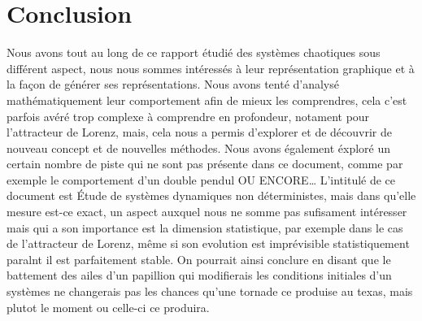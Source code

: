 \chapter{Conclusion}

Nous avons tout au long de ce rapport étudié des systèmes chaotiques
sous différent aspect, nous nous sommes intéressés à leur représentation
graphique et à la façon de générer ses représentations. Nous avons tenté d'analysé mathématiquement leur comportement
afin de mieux les comprendres, cela c'est parfois avéré trop complexe 
à comprendre en profondeur, notament pour l'attracteur de Lorenz, mais,
cela nous a permis d'explorer et de découvrir de nouveau concept et de 
nouvelles méthodes. Nous avons également éxploré un certain nombre de piste qui ne sont
pas présente dans ce document, comme par exemple le comportement d'un double pendul OU ENCORE\dots
L'intitulé de ce document est Étude de systèmes dynamiques non déterministes, mais dans qu'elle mesure est-ce
exact, un aspect auxquel nous ne somme pas sufisament intéresser mais qui a son importance
est la dimension statistique, par exemple dans le cas de l'attracteur de Lorenz, même si 
son evolution est imprévisible statistiquement paralnt il est parfaitement stable. On pourrait
ainsi conclure en disant que le battement des ailes d'un papillion qui modifierais les conditions initiales
d'un systèmes ne changerais pas les chances qu'une tornade ce produise au texas, mais plutot le moment ou celle-ci ce produira. 